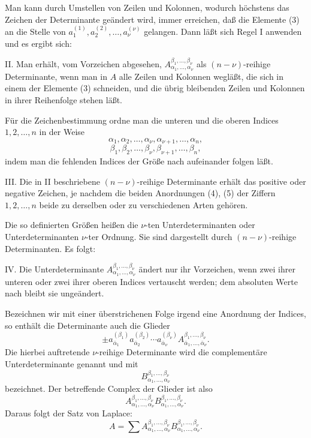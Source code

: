\documentclass[11pt]{article}
\begin{document}
Man kann durch Umstellen von Zeilen und Kolonnen, wodurch höchstens das Zeichen der Determinante geändert wird, immer erreichen, daß die Elemente (3) an die Stelle von \(a_1^{(1)},a_2^{(2)},\ldots,a_\nu^{(\nu)}\) gelangen.  Dann läßt sich Regel I anwenden und es ergibt sich:

II. Man erhält, vom Vorzeichen abgesehen, \(A_{\alpha_1,\ldots,\alpha_\nu}^{\beta_1,\ldots,\beta_\nu}\) als \((n-\nu)\)-reihige Determinante, wenn man in \(A\) alle Zeilen und Kolonnen wegläßt, die sich in einem der Elemente (3) schneiden, und die übrig bleibenden Zeilen und Kolonnen in ihrer Reihenfolge stehen läßt.

Für die Zeichenbestimmung ordne man die unteren und die oberen Indices \(1,2,
\ldots,n\) in der Weise
\begin{equation}
        \alpha_1,\alpha_2,\ldots,\alpha_\nu,\alpha_{\nu+1},\ldots,\alpha_n,
\tag{4}
\end{equation}
\begin{equation}
        \beta_1,\beta_2,\ldots,\beta_\nu,\beta_{\nu+1},\ldots,\beta_n,
\tag{5}
\end{equation}
indem man die fehlenden Indices der Größe nach aufeinander folgen läßt.

III. Die in II beschriebene \((n-\nu)\)-reihige Determinante erhält das positive oder negative Zeichen, je nachdem die beiden Anordnungen (4), (5) der Ziffern \(1,2,\ldots,n\) beide zu derselben oder zu verschiedenen Arten gehören.

Die so definierten Größen heißen die \(\nu\)-ten Unterdeterminanten oder Unterdeterminanten \(\nu\)-ter Ordnung.  Sie sind dargestellt durch \((n-\nu)\)-reihige Determinanten.  Es folgt:

IV. Die Unterdeterminante \(A_{\alpha_1,
\ldots,
\alpha_\nu}^{\beta_1,
\ldots,
\beta_\nu}\) ändert nur ihr Vorzeichen, wenn zwei ihrer unteren oder zwei ihrer oberen Indices vertauscht werden; dem absoluten Werte nach bleibt sie ungeändert.

Bezeichnen wir mit einer überstrichenen Folge irgend eine Anordnung der Indices, so enthält die Determinante auch die Glieder
\[
        \pm a_{\bar\alpha_1}^{(\beta_1)}a_{\bar\alpha_2}^{(\beta_2)}\cdots
        a_{\bar\alpha_\nu}^{(\beta_\nu)}
        A_{\bar\alpha_1,\ldots,\bar\alpha_\nu}^{\beta_1,\ldots,\beta_\nu}.
\]
Die hierbei auftretende \(\nu\)-reihige Determinante wird die complementäre Unterdeterminante genannt und mit
\[
        B_{\alpha_1,\ldots,\alpha_\nu}^{\beta_1,\ldots,\beta_\nu}
\]
bezeichnet.  Der betreffende Complex der Glieder ist also
\begin{equation}
        A_{\alpha_1,\ldots,\alpha_\nu}^{\beta_1,\ldots,\beta_\nu}
        B_{\alpha_1,\ldots,\alpha_\nu}^{\beta_1,\ldots,\beta_\nu}.
\tag{7}
\end{equation}
Daraus folgt der Satz von Laplace:
\begin{equation}
        A=\sum
        A_{\alpha_1,\ldots,\alpha_\nu}^{\beta_1,\ldots,\beta_\nu}
        B_{\alpha_1,\ldots,\alpha_\nu}^{\beta_1,\ldots,\beta_\nu}.
\tag{8}
\end{equation}
\end{document}
